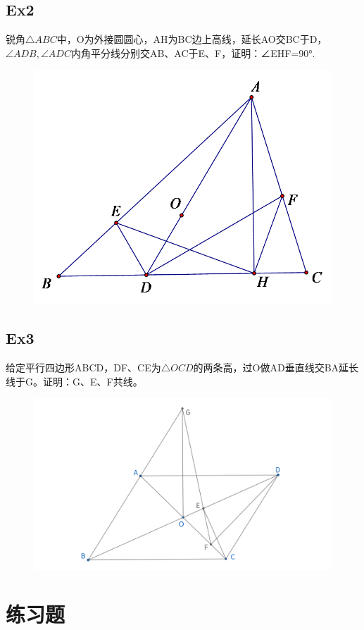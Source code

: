 \documentclass{article}
\begin{document}
\subsection{Ex2}
锐角$\triangle ABC$中，O为外接圆圆心，AH为BC边上高线，延长AO交BC于D，$\angle ADB, \angle ADC$内角平分线分别交AB、AC于E、F，证明：∠EHF=90°.
\begin{figure}[htbp]
    \centering
    \includegraphics[width=0.8\linewidth]{figures/Ex2.png}
\end{figure}

\newpage 
\subsection{Ex3}
给定平行四边形ABCD，DF、CE为$\triangle OCD$的两条高，过O做AD垂直线交BA延长线于G。证明：G、E、F共线。
\begin{figure}[htbp]
    \centering
    \includegraphics[width=0.9\linewidth]{figures/Ex3.png}
\end{figure}

\section{练习题}
\end{document}
